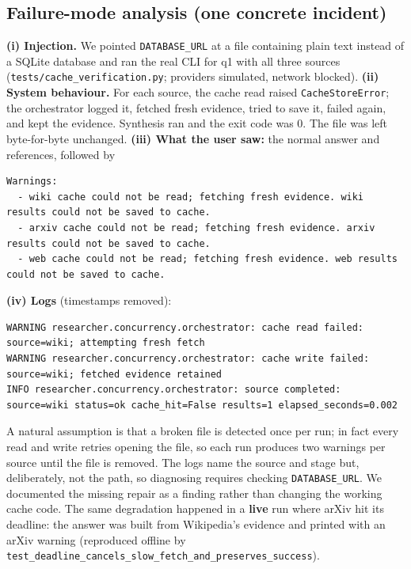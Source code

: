\documentclass[11pt,a4paper]{article}
\newcommand{\cmd}[1]{\texttt{#1}}
\begin{document}
\subsection{Failure-mode analysis (one concrete incident)}

\textbf{(i) Injection.} We pointed \cmd{DATABASE\_URL} at a file containing
plain text instead of a SQLite database and ran the real CLI for q1 with all
three sources (\cmd{tests/cache\_verification.py}; providers simulated, network
blocked).
\textbf{(ii) System behaviour.} For each source, the cache read raised
\texttt{CacheStoreError}; the orchestrator logged it, fetched fresh evidence,
tried to save it, failed again, and kept the evidence. Synthesis ran and the exit
code was 0. The file was left byte-for-byte unchanged.
\textbf{(iii) What the user saw:} the normal answer and references, followed by

\begin{lstlisting}[style=plain]
Warnings:
  - wiki cache could not be read; fetching fresh evidence. wiki results could not be saved to cache.
  - arxiv cache could not be read; fetching fresh evidence. arxiv results could not be saved to cache.
  - web cache could not be read; fetching fresh evidence. web results could not be saved to cache.
\end{lstlisting}

\textbf{(iv) Logs} (timestamps removed):

\begin{lstlisting}[style=plain]
WARNING researcher.concurrency.orchestrator: cache read failed: source=wiki; attempting fresh fetch
WARNING researcher.concurrency.orchestrator: cache write failed: source=wiki; fetched evidence retained
INFO researcher.concurrency.orchestrator: source completed: source=wiki status=ok cache_hit=False results=1 elapsed_seconds=0.002
\end{lstlisting}

A natural assumption is that a broken file is detected once per run; in fact
every read and write retries opening the file, so each run produces two warnings per source until
the file is removed. The logs name the source and stage but, deliberately, not the
path, so diagnosing requires checking \cmd{DATABASE\_URL}. We documented the
missing repair as a finding rather than changing the working cache code. The same
degradation happened in a \textbf{live} run where arXiv hit its deadline: the
answer was built from Wikipedia's evidence and printed with an arXiv warning
(reproduced offline by \cmd{test\_deadline\_cancels\_slow\_fetch\_and\_preserves\_success}).
\end{document}
